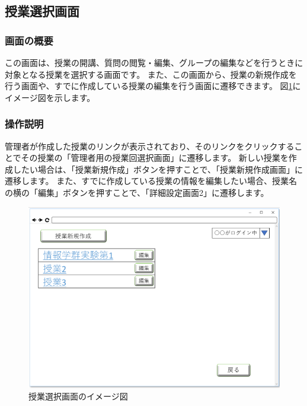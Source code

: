 
\newpage

\subsection{授業選択画面}
\subsubsection{画面の概要}
この画面は、授業の開講、質問の閲覧・編集、グループの編集などを行うときに対象となる授業を選択する画面です。
また、この画面から、授業の新規作成を行う画面や、すでに作成している授業の編集を行う画面に遷移できます。
図\ref{fig:09}にイメージ図を示します。

\subsubsection{操作説明}
管理者が作成した授業のリンクが表示されており、そのリンクをクリックすることでその授業の「管理者用の授業回選択画面」に遷移します。
新しい授業を作成したい場合は、「授業新規作成」ボタンを押すことで、「授業新規作成画面」に遷移します。
また、すでに作成している授業の情報を編集したい場合、授業名の横の「編集」ボタンを押すことで、「詳細設定画面2」に遷移します。

\begin{figure}[htbp]
  \begin{center}
    \includegraphics[width=0.8\linewidth,clip]{./img/09.png}
    \caption{授業選択画面のイメージ図}\label{fig:09}
  \end{center}
\end{figure}


